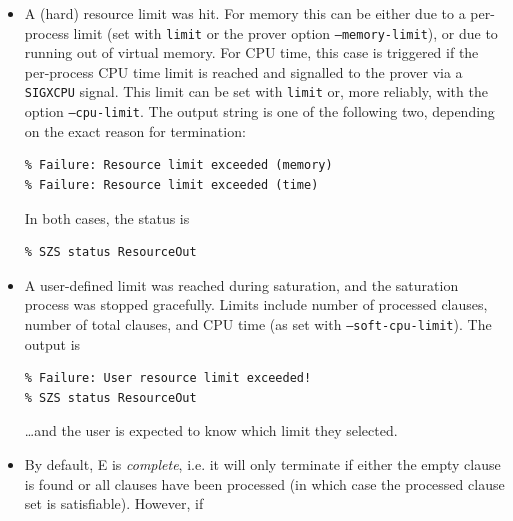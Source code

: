 \documentclass{report}
\begin{document}
\begin{itemize}
  Ensuring the completeness of a prover is much harder than ensuring
  correctness. Moreover, proofs can easily be checked by analyzing the
  output of the prover, while such a check for the absence of proofs
  is rarely possible. I do believe that the current version of E is
  both correct and complete\footnote{Unless the prover runs out of
    memory (see below), the user selects an unfair strategy (in which
    case the prover may never terminate), or some strange and
    unexpected things happen.} but my belief in the former is stronger
  than my belief in the latter\ldots
\item A (hard) resource limit was hit. For memory this can be either
  due to a per-process limit (set with \texttt{limit} or the prover
  option \texttt{--memory-limit}), or due to running out of virtual
  memory. For CPU time, this case is triggered if the per-process CPU
  time limit is reached and signalled to the prover via a
  \texttt{SIGXCPU} signal. This limit can be set with \texttt{limit}
  or, more reliably, with the option \texttt{--cpu-limit}. The output
  string is one of the following two, depending on the exact reason
  for termination:
\begin{verbatim}
% Failure: Resource limit exceeded (memory)
% Failure: Resource limit exceeded (time)
\end{verbatim}
  In both cases, the status is
\begin{verbatim}
% SZS status ResourceOut
\end{verbatim}
\item A user-defined limit was reached during saturation, and the
  saturation process was stopped gracefully. Limits include number of
  processed clauses, number of total clauses, and CPU time (as set
  with \texttt{--soft-cpu-limit}). The output is
\begin{verbatim}
% Failure: User resource limit exceeded!
% SZS status ResourceOut
\end{verbatim}
  \ldots and the user is expected to know which limit they selected.
\item By default, E is \emph{complete}, i.e. it will only terminate if
  either the empty clause is found or all clauses have been processed
  (in which case the processed clause set is satisfiable). However, if

\end{itemize}
\end{document}
